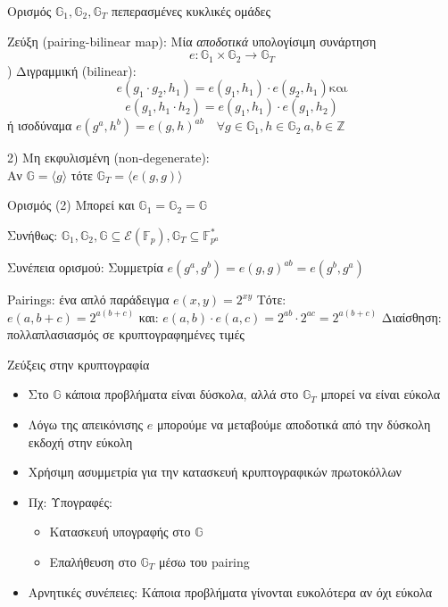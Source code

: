 \documentclass[handout]{beamer}
\begin{document}
\begin{frame}{Ορισμός}
$\mathbb{G}_1, \mathbb{G}_2, \mathbb{G}_T$ πεπερασμένες κυκλικές ομάδες \pause

Ζεύξη (pairing-bilinear map): Μία \emph{αποδοτικά} υπολογίσιμη συνάρτηση 
$$e : \mathbb{G}_1 \times \mathbb{G}_2 \rightarrow \mathbb{G}_T$$
) Διγραμμική (bilinear): 
$$e(g_1 \cdot g_2, h_1) = e(g_1,h_1) \cdot e(g_2,h_1) \text{και}$$
$$e(g_1,h_1 \cdot h_2) = e(g_1,h_1) \cdot e(g_1,h_2)$$
ή ισοδύναμα
$e(g^a,h^b) = e(g,h)^{ab} \quad \forall g \in \mathbb{G}_1, h \in \mathbb{G}_2 \ a,b \in \mathbb{Z}$
\pause

2) Μη εκφυλισμένη (non-degenerate): \\
Αν $\mathbb{G}=\langle g \rangle$ τότε $\mathbb{G}_T = \langle e(g,g) \rangle$

\end{frame}

\begin{frame}{Ορισμός (2)}
Μπορεί και $\mathbb{G}_1 = \mathbb{G}_2 = \mathbb{G}$

Συνήθως: 
$\mathbb{G}_1, \mathbb{G}_2, \mathbb{G} \subseteq \mathcal{E}(\mathbb{F}_p), \mathbb{G}_T \subseteq \mathbb{F}_{p^a}^*$ 
\pause

Συνέπεια ορισμού: Συμμετρία $e(g^a,g^b)  = e(g,g)^{ab} = e(g^b,g^a)$ \pause
\begin{block}{Pairings: ένα απλό παράδειγμα}
	$e(x,y) = 2^{xy}$ Τότε: \\
	$e(a,b+c) = 2^{a(b+c)}$ και:
	$e(a,b) \cdot e(a,c) = 2^{ab} \cdot 2^{ac} = 2^{a(b+c)}$
	Διαίσθηση: πολλαπλασιασμός σε κρυπτογραφημένες τιμές
\end{block}
\end{frame}

\begin{frame}{Ζεύξεις στην κρυπτογραφία}
	\begin{itemize}
		\item Στο $\mathbb{G}$ κάποια προβλήματα είναι δύσκολα, αλλά στο $\mathbb{G}_T$ μπορεί να είναι εύκολα \pause
		\item Λόγω της απεικόνισης $e$ μπορούμε να μεταβούμε αποδοτικά από την δύσκολη εκδοχή στην εύκολη \pause
		\item Χρήσιμη ασυμμετρία για την κατασκευή κρυπτογραφικών πρωτοκόλλων
		\item Πχ: Υπογραφές: \pause
		\begin{itemize}
			\item Κατασκευή	υπογραφής στο $\mathbb{G}$
			\item Επαλήθευση στο $\mathbb{G}_T$ μέσω του pairing
		\end{itemize} \pause
		\item Αρνητικές συνέπειες: Κάποια προβλήματα γίνονται ευκολότερα αν όχι εύκολα
	\end{itemize}
\end{frame}
\end{document}
